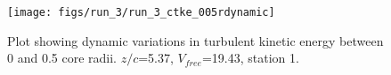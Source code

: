 \begin{figure}[H]
\centering
\texttt{[image: figs/run\_3/run\_3\_ctke\_005rdynamic]}
\caption{Plot showing dynamic variations in turbulent kinetic energy between 0 and 0.5 core radii. $z/c$=5.37, $V_{free}$=19.43, station 1.}
\label{fig:run_3_ctke_005rdynamic}
\end{figure}


